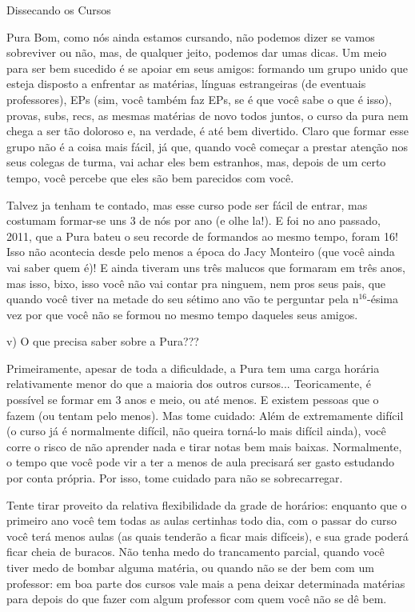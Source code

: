 \begin{secao}{Dissecando os Cursos}
\begin{subsecao}{Pura}
Bom, como nós ainda estamos cursando, não podemos dizer se vamos sobreviver ou não, mas, de qualquer jeito, podemos dar umas dicas. Um meio para ser bem sucedido é se apoiar em seus amigos: formando um grupo unido que esteja disposto a enfrentar as matérias, línguas estrangeiras (de eventuais professores), EPs (sim, você também faz EPs, se é que você sabe o que é isso), provas, subs, recs, as mesmas matérias de novo todos juntos, o curso da pura nem chega a ser tão doloroso e, na verdade, é até bem divertido. Claro que formar esse grupo não é a coisa mais fácil, já que, quando você começar a prestar atenção nos seus colegas de turma, vai achar eles bem estranhos, mas, depois de um certo tempo, você percebe que eles são bem parecidos com você.

Talvez ja tenham te contado, mas esse curso pode ser fácil de entrar, mas costumam formar-se uns 3 de nós por ano (e olhe la!). E foi no ano passado, 2011, que a Pura bateu o seu recorde de formandos ao mesmo tempo, foram 16! Isso não acontecia desde pelo menos a época do Jacy Monteiro (que você ainda vai saber quem é)! E ainda tiveram uns três malucos que formaram em três anos, mas isso, bixo, isso você não vai contar pra ninguem, nem pros seus pais, que quando você tiver na metade do seu sétimo ano vão te perguntar pela n$^16$-ésima vez por que você não se formou no mesmo tempo daqueles seus amigos.  

v) O que precisa saber sobre a Pura??? 

Primeiramente, apesar de toda a dificuldade, a Pura tem uma carga horária relativamente menor do que a maioria dos outros cursos... Teoricamente, é possível se formar em 3 anos e meio, ou até menos. E existem pessoas que o fazem (ou tentam pelo menos). Mas tome cuidado: Além de extremamente difícil (o curso já é normalmente difícil, não queira torná-lo mais difícil ainda), você corre o risco de não aprender nada e tirar notas bem mais baixas. Normalmente, o tempo que você pode vir a ter a menos de aula precisará ser gasto estudando por conta própria. Por isso, tome cuidado para não se sobrecarregar.

Tente tirar proveito da relativa flexibilidade da grade de horários: enquanto que o primeiro ano você tem todas as aulas certinhas todo dia, com o passar do curso você terá menos aulas (as quais tenderão a ficar mais difíceis), e sua grade poderá ficar cheia de buracos. Não tenha medo do trancamento parcial, quando você tiver medo de bombar alguma matéria, ou quando não se der bem com um professor: em boa parte dos cursos vale mais a pena deixar determinada matérias para depois do que fazer com algum professor com quem você não se dê bem.


\end{subsecao}
\end{secao}
